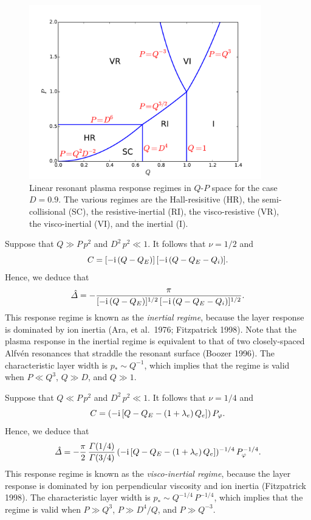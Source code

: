 \documentclass[notitlepage,12pt]{article}
\begin{document}
\begin{figure}[t]
\centerline{\includegraphics[width=0.9\textwidth]{RegimeI.pdf}}
\caption{Linear resonant plasma response regimes in $Q$-$P$ space for the case $D=0.9$. The various regimes are
the Hall-resisitive (HR), the semi-collisional (SC), the resistive-inertial (RI), the visco-resistive (VR), the visco-inertial
(VI), and the inertial (I).}\label{f1}
\end{figure}

Suppose that $Q\gg P\,p^2$ and $D^2\,p^2 \ll 1$. It follows that $\nu=1/2$ and
\begin{equation}
C = [-{\rm i}\,(Q-Q_E)]\,[-{\rm i}\,(Q-Q_E-Q_i)].
\end{equation}
Hence, we deduce that
\begin{equation}
\hat{\mit\Delta} = -\frac{\pi}{[-{\rm i}\,(Q-Q_E)]^{1/2}\,[-{\rm i}\,(Q-Q_E-Q_i)]^{1/2}}.
\end{equation}
This response regime is known as the {\em inertial regime}, because the layer response is dominated by
 ion inertia (Ara, et al.\ 1976; Fitzpatrick 1998). Note that the plasma response in the inertial regime is
 equivalent to that of two closely-spaced Alfv\'{e}n resonances that straddle the resonant surface (Boozer 1996). 
 The characteristic layer width is $p_\ast \sim Q^{-1}$,
which implies that the regime is valid when $P\ll Q^3$, $Q\gg D$, and $Q\gg 1$. 

Suppose that $Q\ll P\,p^2$ and $D^2\,p^2 \ll 1$. It follows that $\nu=1/4$ and
\begin{equation}
C = (-{\rm i}\,[Q-Q_E-(1+\lambda_e)\,Q_e])\,P_\varphi.
\end{equation}
Hence, we deduce that
\begin{equation}
\hat{\mit\Delta} =- \frac{\pi}{2}\,\frac{{\mit\Gamma}(1/4)}{{\mit\Gamma}(3/4)}\, (-{\rm i}\,[Q-Q_E-(1+\lambda_e)\,Q_e])^{-1/4}\,P_\varphi^{-1/4}.
\end{equation}
This response regime is known as the {\em visco-inertial regime}, because the layer response is dominated by
ion perpendicular viscosity and ion inertia (Fitzpatrick 1998). 
 The characteristic layer width is $p_\ast \sim Q^{-1/4}\,P^{-1/4}$,
which implies that the regime is valid when $P\gg Q^3$, $P\gg D^4/Q$, and $P\gg Q^{-3}$. 
\end{document}
